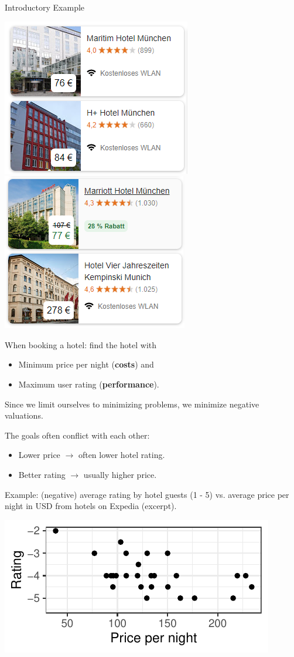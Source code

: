 \begin{frame}[allowframebreaks]{Introductory Example}
\begin{center}
\includegraphics[width = 0.35\linewidth]{images/booking1.png} ~~~ \includegraphics[width = 0.35\linewidth]{images/booking2.png}
\end{center}

When booking a hotel: find the hotel with

\begin{itemize}
\item Minimum price per night (\textbf{costs}) and
\item Maximum user rating (\textbf{performance}).
\end{itemize}

\vfill

\begin{footnotesize}
Since we limit ourselves to minimizing problems, we minimize negative valuations.
\end{footnotesize}

\framebreak

The goals often conflict with each other:

\begin{itemize}
\item Lower price $\to$ often lower hotel rating.
\item Better rating $\to$ usually higher price.
\end{itemize}

Example: (negative) average rating by hotel guests (1 - 5) vs. average price per night in USD from hotels on Expedia (excerpt).

\vspace*{0.2cm}

\centering \includegraphics[scale=1]{images/expedia-1-1}



\end{frame}
